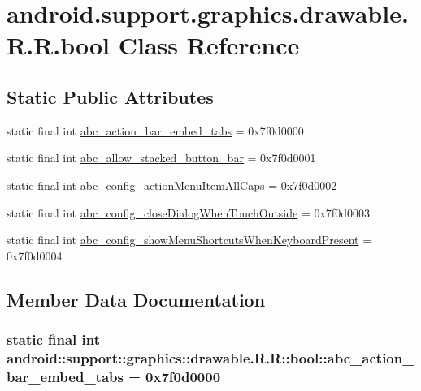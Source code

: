 \hypertarget{classandroid_1_1support_1_1graphics_1_1drawable_1_1_r_1_1bool}{
\section{android.support.graphics.drawable.R.R.bool Class Reference}
\label{classandroid_1_1support_1_1graphics_1_1drawable_1_1_r_1_1bool}
}
\subsection*{Static Public Attributes}
\begin{CompactItemize}
\item 
static final int \hyperlink{classandroid_1_1support_1_1graphics_1_1drawable_1_1_r_1_1bool_9c2056536d0d2c241ac63aa4deb1b22b}{abc\_\-action\_\-bar\_\-embed\_\-tabs} = 0x7f0d0000
\item 
static final int \hyperlink{classandroid_1_1support_1_1graphics_1_1drawable_1_1_r_1_1bool_7cdc644ca09180eabed12a118e6d10cf}{abc\_\-allow\_\-stacked\_\-button\_\-bar} = 0x7f0d0001
\item 
static final int \hyperlink{classandroid_1_1support_1_1graphics_1_1drawable_1_1_r_1_1bool_e9dbce4d6a01c327eb3878b9d2df0310}{abc\_\-config\_\-actionMenuItemAllCaps} = 0x7f0d0002
\item 
static final int \hyperlink{classandroid_1_1support_1_1graphics_1_1drawable_1_1_r_1_1bool_ec800407a3cd53eca26188cbafae93d8}{abc\_\-config\_\-closeDialogWhenTouchOutside} = 0x7f0d0003
\item 
static final int \hyperlink{classandroid_1_1support_1_1graphics_1_1drawable_1_1_r_1_1bool_242da510e10d5409e2a81311ba2ebb9d}{abc\_\-config\_\-showMenuShortcutsWhenKeyboardPresent} = 0x7f0d0004
\end{CompactItemize}


\subsection{Member Data Documentation}
\hypertarget{classandroid_1_1support_1_1graphics_1_1drawable_1_1_r_1_1bool_9c2056536d0d2c241ac63aa4deb1b22b}{
\subsubsection[{abc\_\-action\_\-bar\_\-embed\_\-tabs}]{\setlength{\rightskip}{0pt plus 5cm}static final int android::support::graphics::drawable.R.R::bool::abc\_\-action\_\-bar\_\-embed\_\-tabs = 0x7f0d0000}}
\label{classandroid_1_1support_1_1graphics_1_1drawable_1_1_r_1_1bool_9c2056536d0d2c241ac63aa4deb1b22b}


